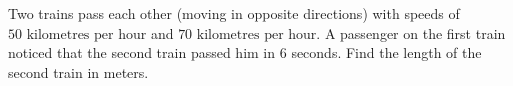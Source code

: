 Two trains pass each other (moving in opposite directions) with speeds of $50\text{ kilometres per hour}$ and $70\text{ kilometres per hour}$. A passenger on the first train noticed that the second train passed him in $6$ seconds. Find the length of the second train in meters.
